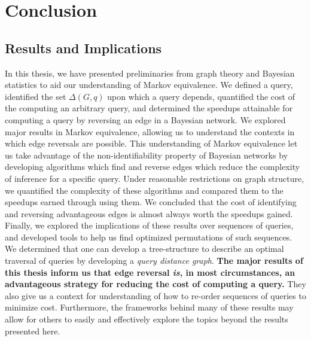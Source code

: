 \chapter{Conclusion}
\section{Results and Implications}
\null \quad \quad In this thesis, we have presented preliminaries from graph theory and Bayesian statistics to aid our understanding of Markov equivalence. We defined a query, identified the set $\Delta(G,q)$ upon which a query depends, quantified the cost of the computing an arbitrary query, and determined the speedups attainable for computing a query by reversing an edge in a Bayesian network. \newline
\null \quad \quad We explored major results in Markov equivalence, allowing us to understand the contexts in which edge reversals are possible. This understanding of Markov equivalence let us take advantage of the non-identifiability property of Bayesian networks by developing algorithms which find and reverse edges which reduce the complexity of inference for a specific query. Under reasonable restrictions on graph structure, we quantified the complexity of these algorithms and compared them to the speedups earned through using them. We concluded that the cost of identifying and reversing advantageous edges is almost always worth the speedups gained. \newline
\null \quad \quad Finally, we explored the implications of these results over sequences of queries, and developed tools to help us find optimized permutations of such sequences. We determined that one can develop a tree-structure to describe an optimal traversal of queries by developing a \textit{query distance graph}. \newline
\null \quad \quad \textbf{The major results of this thesis inform us that edge reversal \textit{is}, in most circumstances, an advantageous strategy for reducing the cost of computing a query.} They also give us a context for understanding of how to re-order sequences of queries to minimize cost. Furthermore, the frameworks behind many of these results may allow for others to easily and effectively explore the topics beyond the results presented here.  

